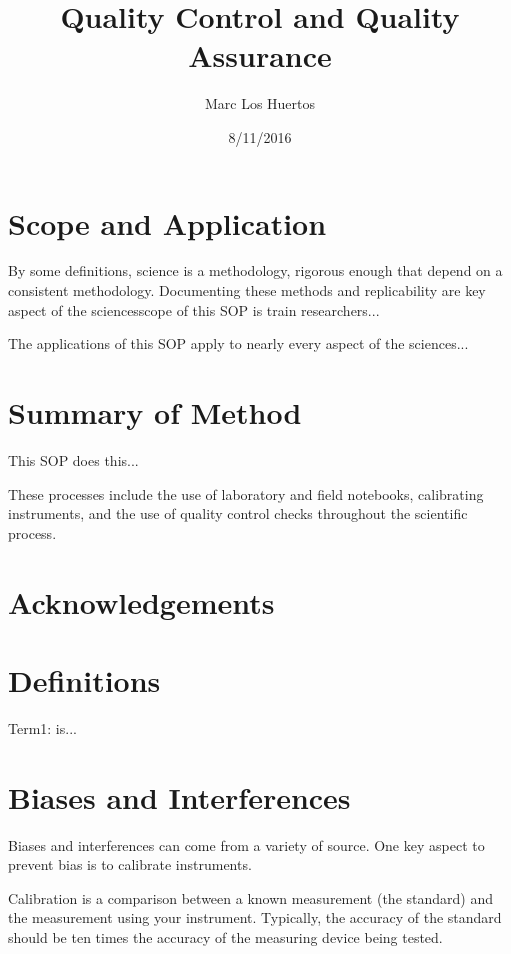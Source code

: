 \documentclass[12pt]{../SOP3_beta}
\title{Quality Control and Quality Assurance}
\date{8/11/2016}
\author{Marc Los Huertos}
\begin{document}


\maketitle

\section{Scope and Application}

\NP By some definitions, science is a methodology, rigorous enough that depend on a consistent methodology. Documenting these methods and replicability are key aspect of the sciencesscope of this SOP is train researchers...

\NP The applications of this SOP apply to nearly every aspect of the sciences...

\section{Summary of Method}

\NP This SOP does this...

\NP These processes include the use of laboratory and field notebooks, calibrating instruments, and the use of quality control checks throughout the scientific process.

\tableofcontents

\newpage

\section{Acknowledgements}

\section{Definitions}

\NP Term1: is...

\section{Biases and Interferences}

\NP Biases and interferences can come from a variety of source. One key aspect to prevent bias is to calibrate instruments. 

\NP Calibration is a comparison between a known measurement (the standard) and the measurement using your instrument. Typically, the accuracy of the standard should be ten times the accuracy of the measuring device being tested. 
\end{document}
